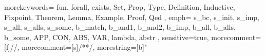 \newcommand{\inferH}[3][]{\infer[\fontsize{8pt}{8pt}{#1}]{#2}{#3}}

\newcommand{\rlsbc}{\inferH[\rlnmsbc{}]{\seqsl{\atom{A}}}{\prog{A}{G} & \seqsl{G}}}
\newcommand{\rlsinit}{\inferH[\rlnmsinit{}]{\seqsl{\atom{A}}}{D \in \dyncon{} & \bchsl{D}{A}}}
\newcommand{\rlst}{\inferH[\rlnmst{}]{\seqsl{\sltm{T}}}{}}
\newcommand{\rlsand}{\inferH[\rlnmsand{}]{\seqsl{G_1 \, \& \, G_2}}{\seqsl{G_1} & \seqsl{G_2}}}
\newcommand{\rlsimp}{\inferH[\rlnmsimp{}]{\seqsl{D \longrightarrow G}}{\seqsl[\dyncon{} \, , \, D]{G}}}
\newcommand{\rlsall}{\inferH[\rlnmsall{}]{\seqsl{\sltm{All} \; G}}{\forall (E : \hybridtm{expr con}), (\sltm{proper} \; E \rightarrow \seqsl{G \, E})}}
\newcommand{\rlsalls}{\inferH[\rlnmsalls{}]{\seqsl{\sltm{Allx} \; G}}{\forall (E : \sltm{X}), (\seqsl{G \, E})}}
\newcommand{\rlssome}{\inferH[\rlnmssome{}]{\seqsl{\sltm{Some} \; G}}{\sltm{proper} \; E & \seqsl{G \, E}}}
\newcommand{\rlbmatch}{\inferH[\rlnmbmatch{}]{\bchsl{\atom{A}}{A}}{}}
\newcommand{\rlbanda}{\inferH[\rlnmbanda{}]{\bchsl{D_1 \, \& \, D_2}{A}}{\bchsl{D_1}{A}}}
\newcommand{\rlbandb}{\inferH[\rlnmbandb{}]{\bchsl{D_1 \, \& \, D_2}{A}}{\bchsl{D_2}{A}}}
\newcommand{\rlbimp}{\inferH[\rlnmbimp{}]{\bchsl{G \longrightarrow D}{A}}{\seqsl{G} & \bchsl{D}{A}}}
\newcommand{\rlball}{\inferH[\rlnmball{}]{\bchsl{\sltm{All} \; D}{A}}{\sltm{proper} \; E & \bchsl{D \, E}{A}}}
\newcommand{\rlballs}{\inferH[\rlnmballs{}]{\bchsl{\sltm{Allx} \; D}{A}}{\bchsl{D \, E}{A}}}
\newcommand{\rlbsome}{\inferH[\rlnmbsome{}]{\bchsl{\sltm{Some} \; D}{A}}{\forall (E : \hybridtm{expr con}), (\sltm{proper} \; E \rightarrow \bchsl{D \, x}{A})}}



{
  morekeywords={
    fun,
    forall,
    exists,
    Set,
    Prop,
    Type,
    Definition,
    Inductive,
    Fixpoint,
    Theorem,
    Lemma,
    Example,
    Proof,
    Qed
  },
  emph={
    s_bc, s_init, s_imp, s_all, s_alls, s_some,
    b_match, b_and1, b_and2, b_imp, b_all, b_alls, b_some,
    APP, CON, ABS, VAR, lambda, abstr
    },
  sensitive=true, %
  morecomment=[l]{//}, %
  morecomment=[s]{/*}{*/}, %
  morestring=[b]" %
}
 
